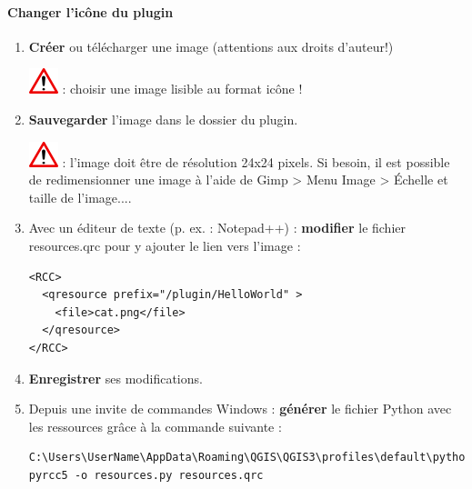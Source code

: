 \documentclass[11pt]{article}
\begin{document}
\paragraph*{Changer l'icône du plugin}
\begin{enumerate}\itemsep0.4em

\item \textbf{Créer} ou télécharger une image (attentions aux droits d'auteur!)

\includegraphics[scale=1]{warningt.png} \underline{}: choisir une image lisible au format icône !

\item \textbf{Sauvegarder} l'image dans le dossier du plugin.

\includegraphics[scale=1]{warningt.png} \underline{}: l'image doit être de résolution 24x24 pixels. Si besoin, il est possible de redimensionner une image à l'aide de Gimp > Menu \og{}Image > Échelle et taille de l'image...\fg{}. 

\item Avec un éditeur de texte (p. ex. : Notepad++) : \textbf{modifier} le fichier \og{}resources.qrc\fg{} pour y ajouter le lien vers l'image : 
\vspace*{-1em}
\begin{center}
\begin{minipage}[t]{0.50\textwidth}
\begin{verbatim}
<RCC>
  <qresource prefix="/plugin/HelloWorld" >
    <file>cat.png</file>
  </qresource>
</RCC>
\end{verbatim}
\end{minipage}
\end{center}

\vspace*{0.4em}
\item \textbf{Enregistrer} ses modifications.

\item Depuis une invite de commandes Windows : \textbf{générer} le fichier Python avec les ressources grâce à la commande suivante : 
\vspace*{-1em}
\begin{center}
\begin{minipage}[t]{0.92\textwidth}
\begin{verbatim}
C:\Users\UserName\AppData\Roaming\QGIS\QGIS3\profiles\default\python\plugins\helloworld>
pyrcc5 -o resources.py resources.qrc
\end{verbatim}
\end{minipage}
\end{center}


\end{enumerate}
\end{document}
